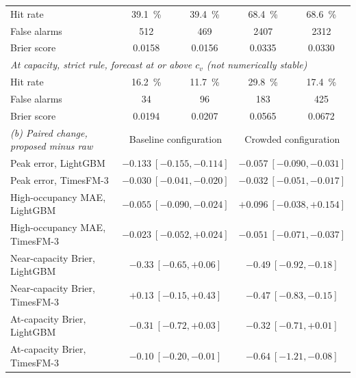 \documentclass[utf8]{FrontiersinHarvard}
\theoremstyle{plain}
\theoremstyle{definition}
\theoremstyle{remark}
\begin{document}
{\begin{table}[htbp]
\begin{tabular}{lcccc}
\quad Hit rate                              & \SI{39.1}{\percent} & \SI{39.4}{\percent} & \SI{68.4}{\percent} & \SI{68.6}{\percent} \\
\quad False alarms                          & \num{512} & \num{469} & \num{2407} & \num{2312} \\
\quad Brier score                           & 0.0158 & 0.0156 & 0.0335 & 0.0330 \\
\midrule
\multicolumn{5}{l}{\emph{At capacity, strict rule, forecast at or above $c_v$ (not numerically stable)}}\\
\quad Hit rate                              & \SI{16.2}{\percent} & \SI{11.7}{\percent} & \SI{29.8}{\percent} & \SI{17.4}{\percent} \\
\quad False alarms                          & \num{34} & \num{96} & \num{183} & \num{425} \\
\quad Brier score                           & 0.0194 & 0.0207 & 0.0565 & 0.0672 \\
\midrule
\emph{(b) Paired change, proposed minus raw} & \multicolumn{2}{c}{Baseline configuration} & \multicolumn{2}{c}{Crowded configuration} \\
\midrule
Peak error, LightGBM                        & \multicolumn{2}{c}{$-0.133\ [-0.155,-0.114]$} & \multicolumn{2}{c}{$-0.057\ [-0.090,-0.031]$} \\
Peak error, TimesFM-3                       & \multicolumn{2}{c}{$-0.030\ [-0.041,-0.020]$} & \multicolumn{2}{c}{$-0.032\ [-0.051,-0.017]$} \\
High-occupancy MAE, LightGBM                & \multicolumn{2}{c}{$-0.055\ [-0.090,-0.024]$} & \multicolumn{2}{c}{$+0.096\ [-0.038,+0.154]$} \\
High-occupancy MAE, TimesFM-3               & \multicolumn{2}{c}{$-0.023\ [-0.052,+0.024]$} & \multicolumn{2}{c}{$-0.051\ [-0.071,-0.037]$} \\
Near-capacity Brier, LightGBM               & \multicolumn{2}{c}{$-0.33\ [-0.65,+0.06]$} & \multicolumn{2}{c}{$-0.49\ [-0.92,-0.18]$} \\
Near-capacity Brier, TimesFM-3              & \multicolumn{2}{c}{$+0.13\ [-0.15,+0.43]$} & \multicolumn{2}{c}{$-0.47\ [-0.83,-0.15]$} \\
At-capacity Brier, LightGBM                 & \multicolumn{2}{c}{$-0.31\ [-0.72,+0.03]$} & \multicolumn{2}{c}{$-0.32\ [-0.71,+0.01]$} \\
At-capacity Brier, TimesFM-3                & \multicolumn{2}{c}{$-0.10\ [-0.20,-0.01]$} & \multicolumn{2}{c}{$-0.64\ [-1.21,-0.08]$} \\
\bottomrule
\end{tabular}
\end{table}}
\end{document}
